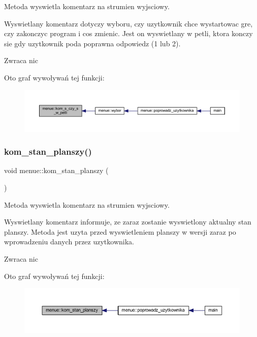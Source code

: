 Metoda wyswietla komentarz na strumien wyjsciowy.

Wyswietlany komentarz dotyczy wyboru, czy uzytkownik chce wystartowac gre, czy zakonczyc program i cos zmienic. Jest on wyswietlany w petli, ktora konczy sie gdy uzytkownik poda poprawna odpowiedz (1 lub 2). \begin{DoxyReturn}{Zwraca}
nic 
\end{DoxyReturn}
Oto graf wywoływań tej funkcji\+:
\nopagebreak
\begin{figure}[H]
\begin{center}
\leavevmode
\includegraphics[width=350pt]{classmenue_a4c13c8e43e1fe3c1eaf62543c126a6b7_icgraph}
\end{center}
\end{figure}
\mbox{\label{classmenue_a0a628bf84deb7c82ff352e762a6ddbba}} 
\subsubsection{\texorpdfstring{kom\+\_\+stan\+\_\+planszy()}{kom\_stan\_planszy()}}
{\footnotesize\ttfamily void menue\+::kom\+\_\+stan\+\_\+planszy (\begin{DoxyParamCaption}{ }\end{DoxyParamCaption})\hspace{0.3cm}{\ttfamily [static]}}

Metoda wyswietla komentarz na strumien wyjsciowy.

Wyswietlany komentarz informuje, ze zaraz zostanie wyswietlony aktualny stan planszy. Metoda jest uzyta przed wyswietleniem planszy w wersji zaraz po wprowadzeniu danych przez uzytkownika. \begin{DoxyReturn}{Zwraca}
nic 
\end{DoxyReturn}
Oto graf wywoływań tej funkcji\+:
\nopagebreak
\begin{figure}[H]
\begin{center}
\leavevmode
\includegraphics[width=350pt]{classmenue_a0a628bf84deb7c82ff352e762a6ddbba_icgraph}
\end{center}
\end{figure}
\mbox{\label{classmenue_a3d62c66c619cbd4ae2fea6dc5a96ec51}} 
